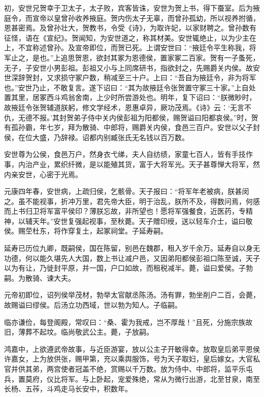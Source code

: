 \documentclass[12pt,UTF8]{ctexbook}
\begin{document}
初，安世兄贺幸于卫太子，太子败，宾客皆诛，安世为贺上书，得下蚕室。后为掖庭令，而宣帝以皇曾孙收养掖庭。贺内伤太子无辜，而曾孙孤幼，所以视养拊循，恩甚密焉。及曾孙壮大，贺教书，令受《诗》，为取许妃，以家财聘之。曾孙数有征怪，语在《宣纪》。贺闻知，为安世道之，称其材美。安世辄绝止，以为少主在上，不宜称述曾孙。及宣帝即位，而贺已死。上谓安世曰：“掖廷令平生称我，将军止之，是也。”上追思贺恩，欲封其冢为恩德侯，置家冢二百家。贺有一子蚤死，无子，子安世小男彭祖。彭祖又小与上同席研书，指欲封之，先赐爵关内侯。故安世深辞贺封，又求损守冢户数，稍减至三十户。上曰：“吾自为掖廷令，非为将军也。”安世乃止，不敢复言。遂下诏曰：“其为故掖廷令张贺置守冢三十家。”上自处置其里，居冢西斗鸡翁舍南，上少时所尝游处也。明年，复下诏曰：“朕微眇时，故掖廷令张贺辅道朕躬，修文学经术，恩惠卓异，厥功茂焉。《诗》云：‘无言不仇，无德不报。’其封贺弟子侍中关内侯彭祖为阳都侯，赐贺谥曰阳都哀侯。”时，贺有孤孙霸，年七岁，拜为散骑、中郎将，赐爵关内侯，食邑三百户。安世以父子封侯，在位大盛，乃辞禄。诏都内别臧张氏无名钱以百万数。



安世尊为公侯，食邑万户，然身衣弋绨，夫人自纺绩，家童七百人，皆有手技作事，内治产业，累织纤微，是以能殖其货，富于大将军光。天子甚尊惮大将军，然内亲安世，心密于光焉。



元康四年春，安世病，上疏归侯，乞骸骨。天子报曰：“将军年老被病，朕甚闵之。虽不能视事，折冲万里，君先帝大臣，明于治乱，朕所不及，得数问焉，何感而上书归卫将军富平侯印？薄朕忘故，非所望也！愿将军强餐食，近医药，专精神，以辅天年。”安世复强起视事，至秋薨。天子赠印绶，送以轻车介士，谥曰敬侯。赐茔杜东，将作穿复土，起冢祠堂。子延寿嗣。



延寿已历位九卿，既嗣侯，国在陈留，别邑在魏郡，租入岁千余万。延寿自以身无功德，何以能久堪先人大国，数上书让减户邑，又因弟阳都侯彭祖口陈至诚，天子以为有让，乃徙封平原，并一国，户口如故，而租税减半。薨，谥曰爱侯。子勃嗣。为散骑、谏大夫。



元帝初即位，诏列侯举茂材，勃举太官献丞陈汤。汤有罪，勃坐削户二百，会薨，故赐谥曰缪侯。后汤立功西域，世以勃为知人。子临嗣。



临亦谦俭，每登阁殿，常叹曰：“桑、霍为我戒，岂不厚哉！”且死，分施宗族故旧，薄葬不起坟。临尚敬武公主。薨，子放嗣。



鸿嘉中，上欲遵武帝故事，与近臣游宴，放以公主子开敏得幸。放取皇后弟平恩侯许嘉女，上为放供张，赐甲第，充以乘舆服饰，号为天子取妇，皇后嫁女。大官私官并供其弟，两宫使者冠盖不绝，赏赐以千万数。放为侍中、中郎将，监平乐屯兵，置莫府，仪比将军。与上卧起，宠爱殊绝，常从为微行出游，北至甘泉，南至长杨、五莋，斗鸡走马长安中，积数年。
\end{document}
